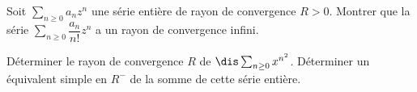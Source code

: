 \documentclass[a4paper,10pt]{report}
\newcommand{\Sum}[2]{\ensuremath{\textstyle{\sum\limits_{#1}^{#2}}}}
\begin{document}

\begin{Exa}[\ding{80}] Soit $\Sum{n \geq 0}{} a_n z^n$ une série entière de rayon de convergence $R>0$. Montrer que  la série $\Sum{n \geq 0}{} \dfrac{a_n}{n!}z^n$ a un rayon de convergence infini. 
\end{Exa}


\begin{Exa}[\ding{80}] Déterminer le rayon de convergence $R$ de $\dis \sum_{n \geq 0} x^{n^2}$. Déterminer un équivalent simple en $R^{-}$ de la somme de cette série entière.
\end{Exa}
\end{document}
